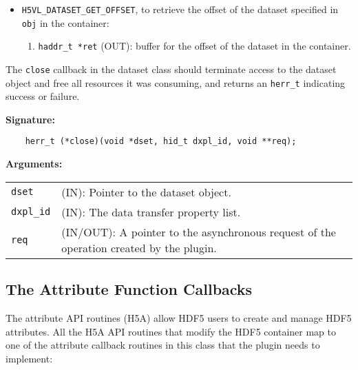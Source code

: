 \begin{itemize}
\item {\tt H5VL\_DATASET\_GET\_OFFSET}, to retrieve the offset of the
  dataset specified in {\tt obj} in the container:
  \begin{enumerate}
  \item {\tt haddr\_t *ret} (OUT): buffer for the offset of the
    dataset in the container.
  \end{enumerate}
\end{itemize}

The {\tt close} callback in the dataset class should terminate access
to the dataset object and free all resources it was consuming, and
returns an {\tt herr\_t} indicating success or failure.

\textbf{Signature:}
\begin{lstlisting}
    herr_t (*close)(void *dset, hid_t dxpl_id, void **req);
\end{lstlisting}

\textbf{Arguments:}\\
\begin{tabular}{l p{10cm}}
  {\tt dset} & (IN): Pointer to the dataset object.\\
  {\tt dxpl\_id} & (IN): The data transfer property list.\\
  {\tt req} & (IN/OUT): A pointer to the asynchronous request of the
  operation created by the plugin.\\
\end{tabular}

\subsection{The Attribute Function Callbacks}
The attribute API routines (H5A) allow HDF5 users to create and manage
HDF5 attributes. All the H5A API routines that modify the HDF5
container map to one of the attribute callback routines in this
class that the plugin needs to implement:

